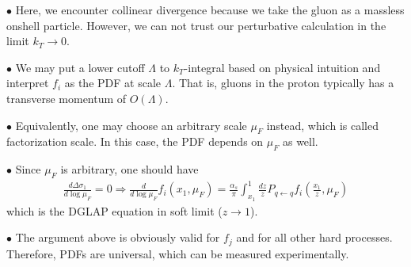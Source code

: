 \documentclass[9pt,a4paper,unknownkeysallowed,xcolor=dvipsnames,aspectratio=43]{beamer}
\begin{document}
\begin{frame}
\vspace{4mm}

{\color{darkred}\Large$\bullet$} Here, we encounter collinear divergence because we take the gluon as a massless onshell particle. However, we can not trust our perturbative calculation in the limit $k_T\to 0$.\\
\vspace{4mm}

{\color{darkred}\Large$\bullet$} We may put a lower cutoff $\Lambda$ to $k_T$-integral based on physical intuition and interpret $f_i$ as the PDF at scale $\Lambda$. That is, gluons in the proton typically has a transverse momentum of $O(\Lambda)$. \\
\vspace{4mm}

{\color{darkred}\Large$\bullet$} Equivalently, one may choose an arbitrary scale $\mu_F$ instead, which is called {\color{darkred}factorization scale}. In this case, the PDF depends on $\mu_F$ as well.\\
\vspace{4mm}
 
 {\color{darkred}\Large$\bullet$} Since $\mu_F$ is arbitrary, one should have
 \begin{align}
     \frac{d\Delta \sigma_1}{d\log \mu_F} =0 \Rightarrow \frac{d }{d\log \mu_F} f_{i}(x_1,\mu_F) = \frac{\alpha_s }{\pi}\int_{x_1}^1\frac{dz}{z}P_{q\leftarrow q} f_i(\frac{x_1}{z}, \mu_F)
 \end{align}
 which is {\color{darkred}the DGLAP equation} in soft limit ($z\to 1$).\\\vspace{4mm}
 
 {\color{darkred}\Large$\bullet$} The argument above is obviously valid for $f_j$ and for all other hard processes. Therefore, PDFs are {\color{darkred}universal}, which can be measured experimentally. 
\end{frame}
%
%
\end{document}
